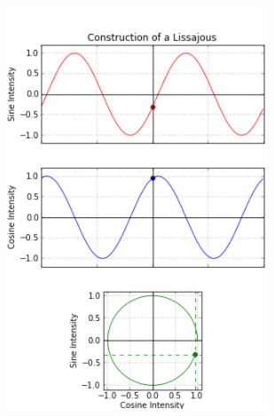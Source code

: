 \documentclass[11pt]{article}
\numberwithin{equation}{section}
\begin{document}
\begin{figure}[H]
\begin{minipage}[b]{0.49\textwidth}
    \includegraphics[width=\textwidth]{./img/Lissajous2.png}
  \end{minipage}
\end{figure}
\end{document}
